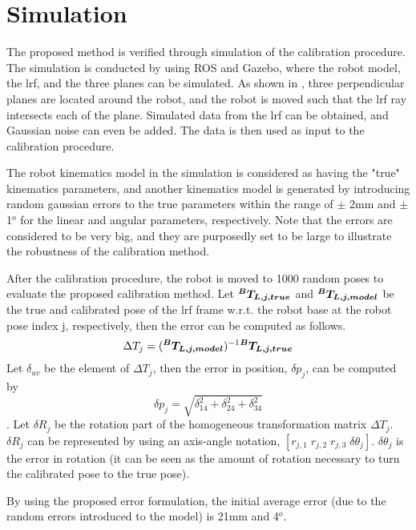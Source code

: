 \section{Simulation}
\label{sec:simulation}

The proposed method is verified through simulation of the calibration procedure. The simulation is conducted by using ROS and Gazebo, where the robot model, the \ac{lrf}, and the three planes can be simulated.  
As shown in , three perpendicular planes are located around the robot, and the robot is moved such that the \ac{lrf} ray intersects each of the plane. Simulated data from the \ac{lrf} can be obtained, and Gaussian noise can even be added. The data is then used as input to the calibration procedure. 

The robot kinematics model in the simulation is considered as having the "true" kinematics parameters, and another kinematics model is generated by introducing random gaussian errors to the true parameters within the range of $\pm$ 2mm and $\pm$ 1$^o$ for the linear and angular parameters, respectively. Note that the errors are considered to be very big, and they are purposedly set to be large to illustrate the robustness of the calibration method. 

After the calibration procedure, the robot is moved to 1000 random poses to evaluate the proposed calibration method. Let $\vb*{{^B}T_{L,j,true}}$ and $\vb*{{^B}T_{L,j,model}}$ be the true and calibrated pose of the \ac{lrf} frame w.r.t. the robot base at the robot pose index j, respectively, then the error can be computed as follows. 
\begin{equation}
\Delta T_j =  (\vb*{{^B}T_{L,j,model}})^{-1} \vb*{{^B}T_{L,j,true}}
\end{equation}
Let $\delta_{uv}$ be the element of $\Delta T_j$, then the error in position, $\delta p_j$, can be computed by
\begin{equation}
\delta p_j = \sqrt{\delta_{14}^2 + \delta_{24}^2 + \delta_{34}^2}
\end{equation}.
Let $\delta R_j$ be the rotation part of the homogeneous transformation matrix $\Delta T_j$. $\delta R_j$ can be represented by using an axis-angle notation, $[r_{j,1}\; r_{j,2}\; r_{j,3}\; \delta \theta_j]$. $\delta\theta_j$ is the error in rotation (it can be seen as the amount of rotation necessary to turn the calibrated pose to the true pose). 

By using the proposed error formulation, the initial average error (due to the random errors introduced to the model) is 21mm and 4$^o$.



